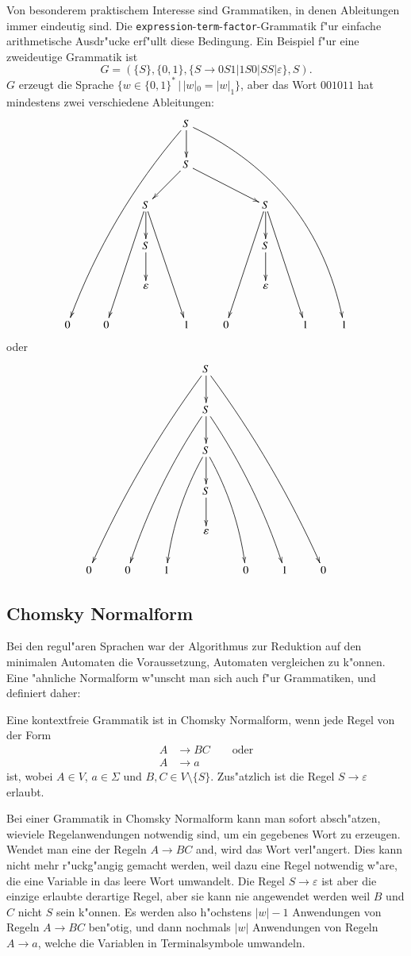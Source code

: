 Von besonderem praktischem Interesse sind Grammatiken, in denen
Ableitungen immer eindeutig sind. Die
{\tt expression}-{\tt term}-{\tt factor}-Grammatik f"ur einfache
arithmetische Ausdr"ucke erf"ullt diese Bedingung. 
Ein Beispiel f"ur eine zweideutige Grammatik ist
\[
G=(\{S\}, \{0,1\}, \{S\to 0S1|1S0|SS|\varepsilon\}, S).
\]
$G$ erzeugt die Sprache
$\{w\in \{0,1\}^*\,|\, |w|_0 = |w|_1\}$, aber das Wort
$001011$ hat mindestens zwei verschiedene Ableitungen:
\[
\xymatrix{
&&&S\ar@/_10pt/[dddddlll]\ar[d]\ar@/^30pt/[dddddrrrr]
\\
&&&S\ar[dl]\ar[drr]
\\
 &&S\ar[dddl]\ar[d]\ar[dddr]&&&S\ar[dddl]\ar[d]\ar[dddr]&&
\\
&&S\ar[d]&&&S\ar[d]&&
\\
 & &\varepsilon& & &\varepsilon& & 
\\
0&0&           &1&0&           &1&1
}
\]
oder
\[
\xymatrix{
&&&S\ar@/_/[dddddlll]\ar[d]\ar@/^/[dddddrrr]
\\
&&&S\ar@/_/[ddddll]\ar[d]\ar@/^/[ddddrr]&&&
\\
&&&S\ar@/_/[dddl]\ar[d]\ar@/^/[dddr]&&&
\\
&&&S\ar[d]&&&
\\
&&&\varepsilon&&&
\\
0&0&1&&0&1&0
}
\]


\subsection{Chomsky Normalform}
Bei den regul"aren Sprachen war der Algorithmus zur Reduktion
auf den minimalen Automaten die Voraussetzung, Automaten vergleichen
zu k"onnen. Eine "ahnliche Normalform w"unscht man sich auch f"ur
Grammatiken, und definiert daher:
\begin{definition}
Eine kontextfreie Grammatik  ist in Chomsky Normalform, wenn
jede Regel von der Form
\begin{align*}
A&\to BC\qquad\text{oder}\\
A&\to a
\end{align*}
ist, wobei $A\in V$, $a\in\Sigma$ und $B, C\in V\setminus\{S\}$.
Zus"atzlich ist die Regel $S\to\varepsilon$ erlaubt. 
\end{definition}

Bei einer Grammatik in Chomsky Normalform kann man sofort absch"atzen,
wieviele Regelanwendungen notwendig sind, um ein gegebenes Wort
zu erzeugen. Wendet man eine der Regeln $A\to BC$ and, wird das
Wort verl"angert. Dies kann nicht mehr r"uckg"angig gemacht
werden, weil dazu eine Regel notwendig w"are, die eine Variable
in das leere Wort umwandelt. Die Regel $S\to\varepsilon$ ist aber
die einzige erlaubte derartige Regel, aber sie kann nie angewendet
werden weil $B$ und $C$ nicht $S$ sein k"onnen. Es werden also
h"ochstens $|w|-1$ Anwendungen von Regeln $A\to BC$ ben"otig, und dann
nochmals $|w|$ Anwendungen von Regeln $A\to a$, welche die Variablen
in Terminalsymbole umwandeln. 

